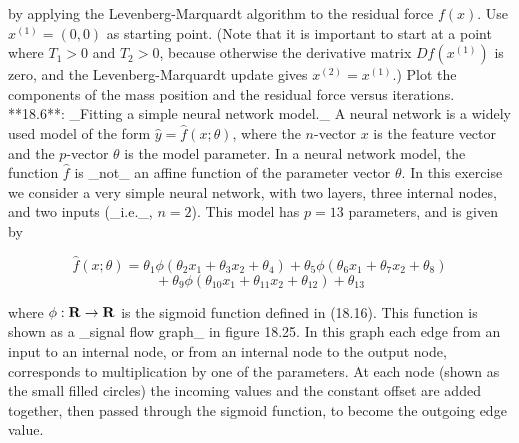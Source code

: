 by applying the Levenberg-Marquardt algorithm to the residual force \(f(x)\). Use \(x^{(1)}=(0,0)\) as starting point. (Note that it is important to start at a point where \(T_{1}>0\) and \(T_{2}>0\), because otherwise the derivative matrix \(Df(x^{(1)})\) is zero, and the Levenberg-Marquardt update gives \(x^{(2)}=x^{(1)}\).) Plot the components of the mass position and the residual force versus iterations.
**18.6**: _Fitting a simple neural network model._ A neural network is a widely used model of the form \(\hat{y}=\hat{f}(x;\theta)\), where the \(n\)-vector \(x\) is the feature vector and the \(p\)-vector \(\theta\) is the model parameter. In a neural network model, the function \(\hat{f}\) is _not_ an affine function of the parameter vector \(\theta\). In this exercise we consider a very simple neural network, with two layers, three internal nodes, and two inputs (_i.e._, \(n=2\)). This model has \(p=13\) parameters, and is given by

\[\hat{f}(x;\theta) = \theta_{1}\phi(\theta_{2}x_{1}+\theta_{3}x_{2}+\theta_{4})+ \theta_{5}\phi(\theta_{6}x_{1}+\theta_{7}x_{2}+\theta_{8})\] \[\mbox{}+\theta_{9}\phi(\theta_{10}x_{1}+\theta_{11}x_{2}+\theta_ {12})+\theta_{13}\]

where \(\phi:{\bf R}\rightarrow{\bf R}\) is the sigmoid function defined in (18.16). This function is shown as a _signal flow graph_ in figure 18.25. In this graph each edge from an input to an internal node, or from an internal node to the output node, corresponds to multiplication by one of the parameters. At each node (shown as the small filled circles) the incoming values and the constant offset are added together, then passed through the sigmoid function, to become the outgoing edge value.

